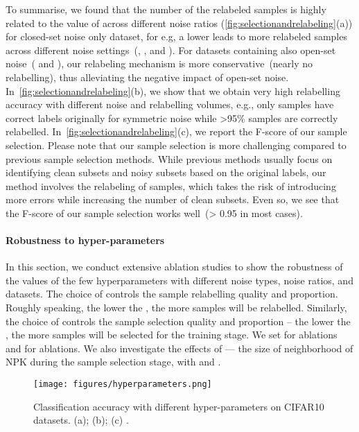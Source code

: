 \documentclass{bmvc2k}
\begin{document}
To summarise, we found that the number of the relabeled samples is highly related to the value of  across different noise ratios (\cref{fig:selectionandrelabeling}(a)) for closed-set noise only dataset, for e.g, a lower  leads to more relabeled samples across different noise settings~(, ,  and ). For datasets containing also open-set noise~( and ), our relabeling mechanism is more conservative~(nearly no relabelling), thus alleviating the negative impact of open-set noise. In~\cref{fig:selectionandrelabeling}(b), we show that we obtain very high relabelling accuracy with different noise and relabelling volumes, e.g., only  samples have correct labels originally for  symmetric noise while >95\% samples are correctly relabelled. In~\cref{fig:selectionandrelabeling}(c), we report the F-score of our sample selection. Please note that our sample selection is more challenging compared to previous sample selection methods. While previous methods usually focus on identifying clean subsets and noisy subsets based on the original labels, our method involves the relabeling of samples, which takes the risk of introducing more errors while increasing the number of clean subsets. Even so, we see that the F-score of our sample selection works well~(> 0.95 in most cases).

\paragraph{Robustness to hyper-parameters} In this section, we conduct extensive ablation studies to show the robustness of the values of the few hyperparameters with different noise types, noise ratios, and datasets. The choice of  controls the sample relabelling quality and proportion. Roughly speaking, the lower the , the more samples will be relabelled. Similarly, the choice of  controls the sample selection quality and proportion -- the lower the , the more samples will be selected for the training stage. We set  for  ablations and  for  ablations. We also investigate the effects of  --- the size of neighborhood of NPK  during the sample selection stage, with  and .
\begin{figure}[htbp]
\begin{center}
\texttt{[image: figures/hyperparameters.png]}
\end{center}
\caption{Classification accuracy with different hyper-parameters on CIFAR10 datasets. (a); (b); (c) .}
\label{fig:hyperparameters}
\end{figure}
\end{document}
